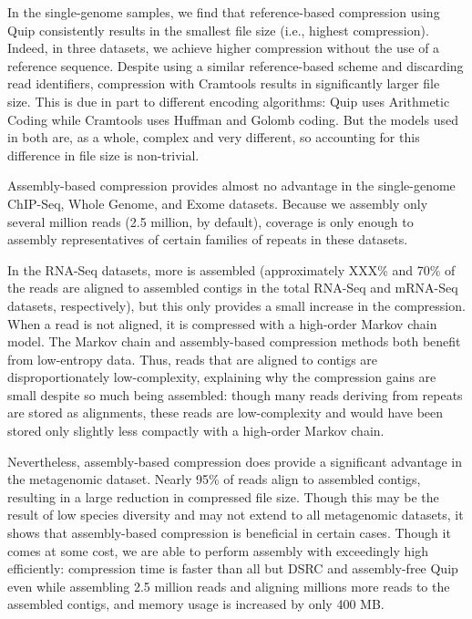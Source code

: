 \documentclass[twocolumn]{article}
\begin{document}
In the single-genome samples, we find that reference-based compression using
Quip consistently results in the smallest file size (i.e., highest
compression). Indeed, in three datasets, we achieve higher compression without
the use of a reference sequence. Despite using a similar reference-based
scheme and discarding read identifiers, compression with Cramtools results in
significantly larger file size. This is due in part to different encoding
algorithms: Quip uses Arithmetic Coding while Cramtools uses Huffman and
Golomb coding. But the models used in both are, as a whole, complex and very
different, so accounting for this difference in file size is non-trivial.

Assembly-based compression provides almost no advantage in the single-genome
ChIP-Seq, Whole Genome, and Exome datasets. Because we assembly only several
million reads (2.5 million, by default), coverage is only enough to assembly
representatives of certain families of repeats in these datasets.

In the RNA-Seq datasets, more is assembled (approximately XXX\% and 70\% of
the reads are aligned to assembled contigs in the total RNA-Seq and mRNA-Seq
datasets, respectively), but this only provides a small increase in the
compression. When a read is not aligned, it is compressed with a high-order
Markov chain model. The Markov chain and assembly-based compression methods
both benefit from low-entropy data. Thus, reads that are aligned to contigs
are disproportionately low-complexity, explaining why the compression gains
are small despite so much being assembled: though many reads deriving from
repeats are stored as alignments, these reads are low-complexity and would
have been stored only slightly less compactly with a high-order Markov chain.

Nevertheless, assembly-based compression does provide a significant advantage
in the metagenomic dataset. Nearly 95\% of reads align to assembled contigs,
resulting in a large reduction in compressed file size. Though this may be the
result of low species diversity and may not extend to all metagenomic
datasets, it shows that assembly-based compression is beneficial in certain
cases. Though it comes at some cost, we are able to perform assembly with
exceedingly  high efficiently: compression time is faster than all but DSRC
and assembly-free Quip even while assembling 2.5 million reads and aligning
millions more reads to the assembled contigs, and memory usage is increased by
only 400 MB.
\end{document}
